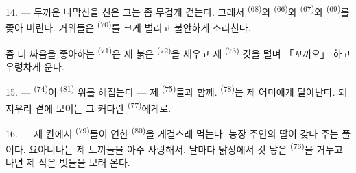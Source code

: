 14. --- 두꺼운 나막신을 신은 그는 좀 무겁게 걷는다. 그래서 
\textsuperscript{(68)}와  \textsuperscript{(66)}와 
\textsuperscript{(67)}와  \textsuperscript{(69)}를 쫓아 버린다. 거위들은
 \textsuperscript{(70)}를 크게 벌리고 불안하게 소리친다.

좀 더 싸움을 좋아하는  \textsuperscript{(71)}은 제 붉은 
\textsuperscript{(72)}을 세우고 제  \textsuperscript{(73)} 깃을 털며
「꼬끼오」 하고 우렁차게 운다.

15. ---  \textsuperscript{(74)}이  \textsuperscript{(81)} 위를
헤집는다 — 제  \textsuperscript{(75)}들과 함께. 
\textsuperscript{(78)}는 제 어미에게 달아난다. 돼지우리 곁에 보이는 그 커다란
 \textsuperscript{(77)}에게로.

16. --- 제 칸에서  \textsuperscript{(79)}들이 연한 
\textsuperscript{(80)}을 게걸스레 먹는다. 농장 주인의 딸이 갖다 주는 풀이다. 요아니나는
제 토끼들을 아주 사랑해서, 날마다 닭장에서 갓 낳은  \textsuperscript{(76)}을
거두고 나면 제 작은 벗들을 보러 온다.

\VUsaut{6.0mm}
\VUfilet{22mm}
